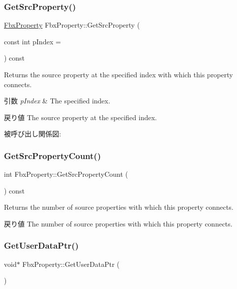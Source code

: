 \subsubsection{\texorpdfstring{Get\+Src\+Property()}{GetSrcProperty()}}
{\footnotesize\ttfamily \hyperlink{class_fbx_property}{Fbx\+Property} Fbx\+Property\+::\+Get\+Src\+Property (\begin{DoxyParamCaption}\item[{const int}]{p\+Index = {} }\end{DoxyParamCaption}) const}

Returns the source property at the specified index with which this property connects. 
\begin{DoxyParams}{引数}
{\em p\+Index} & The specified index. \\
\hline
\end{DoxyParams}
\begin{DoxyReturn}{戻り値}
The source property at the specified index. 
\end{DoxyReturn}
被呼び出し関係図\+:
\mbox{\label{class_fbx_property_a536aec7568f10441cf70045aa8842429}} 
\subsubsection{\texorpdfstring{Get\+Src\+Property\+Count()}{GetSrcPropertyCount()}}
{\footnotesize\ttfamily int Fbx\+Property\+::\+Get\+Src\+Property\+Count (\begin{DoxyParamCaption}{ }\end{DoxyParamCaption}) const}

Returns the number of source properties with which this property connects. \begin{DoxyReturn}{戻り値}
The number of source properties with which this property connects. 
\end{DoxyReturn}
\mbox{\label{class_fbx_property_a4d1057bd2c1b78585aad480c88a40a11}} 
\subsubsection{\texorpdfstring{Get\+User\+Data\+Ptr()}{GetUserDataPtr()}}
{\footnotesize\ttfamily void$\ast$ Fbx\+Property\+::\+Get\+User\+Data\+Ptr (\begin{DoxyParamCaption}{ }\end{DoxyParamCaption})}

